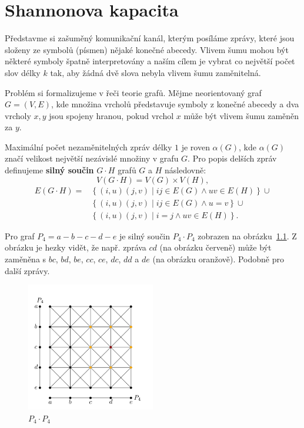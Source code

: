\chapter{Shannonova kapacita}

Představme si zašuměný komunikační kanál, kterým posíláme zprávy, které jsou složeny ze symbolů (písmen) nějaké konečné abecedy. Vlivem šumu mohou být některé symboly špatně interpretovány a naším cílem je vybrat co největší počet slov délky $k$ tak, aby žádná dvě slova nebyla vlivem šumu zaměnitelná.

Problém si formalizujeme v řeči teorie grafů. Mějme neorientovaný graf $G = (V, E)$, kde množina vrcholů představuje symboly z konečné abecedy a dva vrcholy $x, y$ jsou spojeny hranou, pokud vrchol $x$ může být vlivem šumu zaměněn za $y$.

Maximální počet nezaměnitelných zpráv délky $1$ je roven $\alpha(G)$, kde $\alpha(G)$ značí velikost největší nezávislé množiny v grafu $G$. Pro popis delších zpráv definujeme \textbf{silný součin} $G \cdot H$ grafů $G$ a $H$ následovně:
$$
    V(G \cdot H) = V(G) \times V(H),
$$
\begin{equation*}
    \begin{split}
    E(G \cdot H) = &\left\{ (i,u)(j,v) \mid ij \in E(G) \wedge uv \in E(H) \right\} \cup \\
                   &\left\{ (i,u)(j,v) \mid ij \in E(G) \wedge u = v \right\} \cup \\
                   &\left\{ (i,u)(j,v) \mid i = j \wedge uv \in E(H) \right\}.
    \end{split}
\end{equation*}

\begin{pr}
Pro graf $P_4 = a-b-c-d-e$ je silný součin $P_4 \cdot P_4$ zobrazen na obrázku~\ref{fig:strong_product_P4_P4}. Z obrázku je hezky vidět, že např. zpráva $cd$ (na obrázku červeně) může být zaměněna s $bc$, $bd$, $be$, $cc$, $ce$, $dc$, $dd$ a $de$ (na obrázku oranžově). Podobně pro další zprávy.
\end{pr}

\begin{figure}[h!]
    \centering
    \includegraphics[width=0.5\textwidth]{img/strong_product_P4_P4.png}   
    \caption{$P_4 \cdot P_4$}
    \label{fig:strong_product_P4_P4}
\end{figure}

